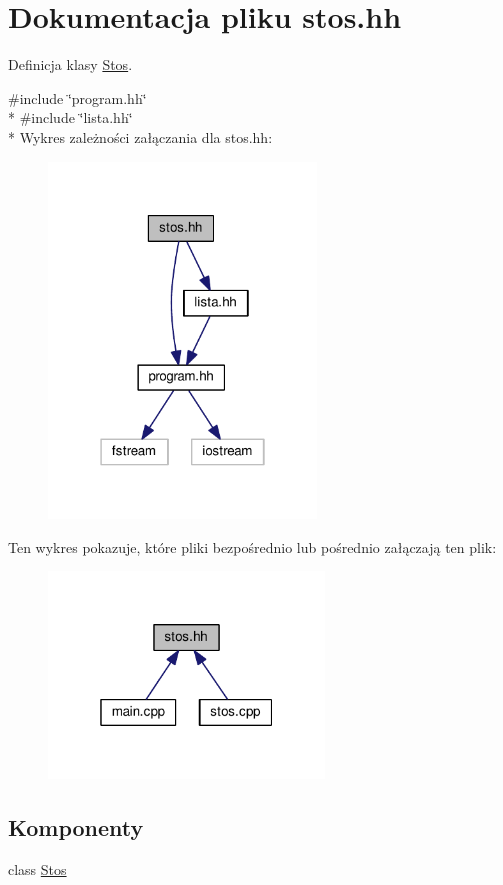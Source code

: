 \hypertarget{stos_8hh}{\section{Dokumentacja pliku stos.\-hh}
\label{stos_8hh}
}


Definicja klasy \hyperlink{class_stos}{Stos}.  


{\ttfamily \#include \char`\"{}program.\-hh\char`\"{}}\\*
{\ttfamily \#include \char`\"{}lista.\-hh\char`\"{}}\\*
Wykres zależności załączania dla stos.\-hh\-:\nopagebreak
\begin{figure}[H]
\begin{center}
\leavevmode
\includegraphics[width=202pt]{stos_8hh__incl}
\end{center}
\end{figure}
Ten wykres pokazuje, które pliki bezpośrednio lub pośrednio załączają ten plik\-:\nopagebreak
\begin{figure}[H]
\begin{center}
\leavevmode
\includegraphics[width=208pt]{stos_8hh__dep__incl}
\end{center}
\end{figure}
\subsection*{Komponenty}
\begin{DoxyCompactItemize}
\item 
class \hyperlink{class_stos}{Stos}
\end{DoxyCompactItemize}
